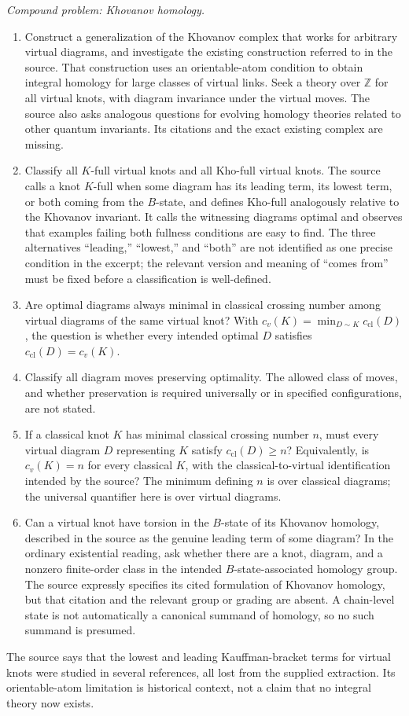 \documentclass[11pt]{article}
\newcommand{\Z}{\mathbb{Z}}
\begin{document}
\emph{Compound problem: Khovanov homology.}
\begin{enumerate}
\item Construct a generalization of the Khovanov complex that works for arbitrary virtual diagrams, and investigate the existing construction referred to in the source. That construction uses an orientable-atom condition to obtain integral homology for large classes of virtual links. Seek a theory over \(\Z\) for all virtual knots, with diagram invariance under the virtual moves. The source also asks analogous questions for evolving homology theories related to other quantum invariants. Its citations and the exact existing complex are missing.
\item Classify all \(K\)-full virtual knots and all \(\mathrm{Kho}\)-full virtual knots. The source calls a knot \(K\)-full when some diagram has its leading term, its lowest term, or both coming from the \(B\)-state, and defines \(\mathrm{Kho}\)-full analogously relative to the Khovanov invariant. It calls the witnessing diagrams optimal and observes that examples failing both fullness conditions are easy to find. The three alternatives ``leading,'' ``lowest,'' and ``both'' are not identified as one precise condition in the excerpt; the relevant version and meaning of ``comes from'' must be fixed before a classification is well-defined.
\item Are optimal diagrams always minimal in classical crossing number among virtual diagrams of the same virtual knot? With \(c_v(K)=\min_{D\sim K}c_{\mathrm{cl}}(D)\), the question is whether every intended optimal \(D\) satisfies \(c_{\mathrm{cl}}(D)=c_v(K)\).
\item Classify all diagram moves preserving optimality. The allowed class of moves, and whether preservation is required universally or in specified configurations, are not stated.
\item If a classical knot \(K\) has minimal classical crossing number \(n\), must every virtual diagram \(D\) representing \(K\) satisfy \(c_{\mathrm{cl}}(D)\geq n\)? Equivalently, is \(c_v(K)=n\) for every classical \(K\), with the classical-to-virtual identification intended by the source? The minimum defining \(n\) is over classical diagrams; the universal quantifier here is over virtual diagrams.
\item Can a virtual knot have torsion in the \(B\)-state of its Khovanov homology, described in the source as the genuine leading term of some diagram? In the ordinary existential reading, ask whether there are a knot, diagram, and a nonzero finite-order class in the intended \(B\)-state-associated homology group. The source expressly specifies its cited formulation of Khovanov homology, but that citation and the relevant group or grading are absent. A chain-level state is not automatically a canonical summand of homology, so no such summand is presumed.
\end{enumerate}
The source says that the lowest and leading Kauffman-bracket terms for virtual knots were studied in several references, all lost from the supplied extraction. Its orientable-atom limitation is historical context, not a claim that no integral theory now exists.
\end{document}
